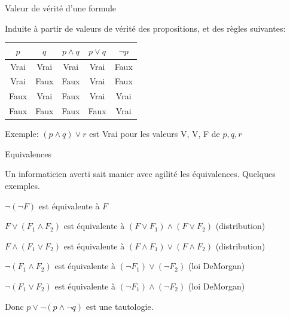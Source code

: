 \begin{frame}[fragile]{Valeur de vérité d'une formule}

Induite à partir de valeurs de vérité des propositions, et des règles suivantes:

\vfill

\begin{tabular}{c|c|c|c|c}
$p$ & $q$ & $p \land q$ & $p \lor q$ & $\neg p$\\ \hline
Vrai & Vrai & Vrai & Vrai &  Faux \\ \hline
Vrai & Faux & Faux & Vrai &  Faux \\ \hline
Faux & Vrai & Faux & Vrai &  Vrai \\ \hline
Faux & Faux & Faux & Faux &  Vrai \\ \hline
\end{tabular}
\vfill

Exemple: $(p \land q) \lor r$ est Vrai pour les valeurs V, V, F de $p, q, r$

\end{frame}



\begin{frame}[fragile]{Equivalences}

Un informaticien averti sait manier avec agilité les équivalences. Quelques exemples.

\vfill

\begin{redbullet}
   \item  $\neg (\neg F)$ est équivalente à $F$ 
  \item  $F \lor (F_1 \land F_2)$ est équivalente à $(F\lor F_1) \land (F \lor F_2)$ (distribution)
   \item  $F \land (F_1 \lor F_2)$ est équivalente à $(F\land F_1) \lor (F \land F_2)$ (distribution)
   \item  $\neg (F_1 \land F_2)$ est équivalente à $(\neg F_1) \lor (\neg F_2)$ (loi DeMorgan)
   \item  $\neg (F_1 \lor F_2)$ est équivalente à $(\neg F_1) \land (\neg F_2)$ (loi DeMorgan)
\end{redbullet}

\vfill

Donc $p \lor \neg (p \land \neg q)$ est une \alert{tautologie}.
\end{frame}


